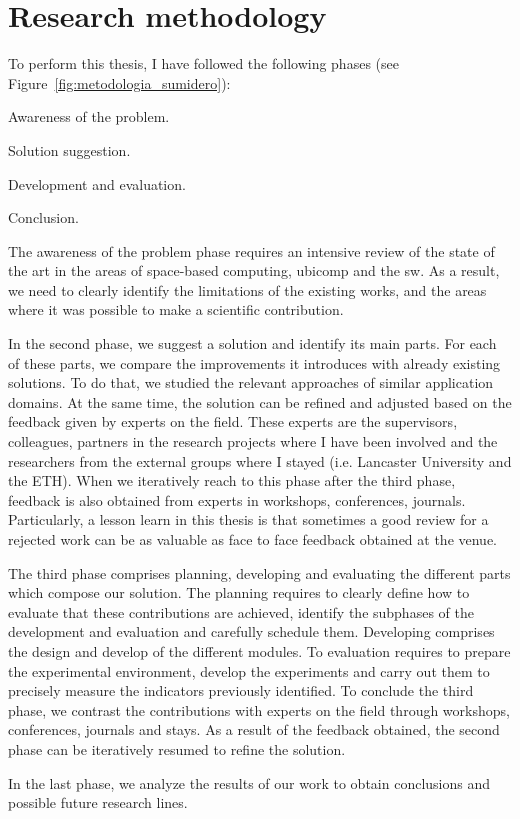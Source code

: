 \section{Research methodology}

To perform this thesis, I have followed the following phases (see Figure~\ref{fig:metodologia_sumidero}):
\begin{enumerate*}[label=\itshape\alph*\upshape)]
  \item Awareness of the problem.
  \item Solution suggestion.
  \item Development and evaluation.
  \item Conclusion.
\end{enumerate*}


The awareness of the problem phase requires an intensive review of the state of the art in the areas of
space-based computing, \acl{ubicomp} and the \acl{sw}.
As a result, we need to clearly identify the limitations of the existing works,
and the areas where it was possible to make a scientific contribution.


In the second phase, we suggest a solution and identify its main parts.
For each of these parts, we compare the improvements it introduces with already existing solutions.
To do that, we studied the relevant approaches of similar application domains.
At the same time, the solution can be refined and adjusted based on the feedback given by experts on the field.
These experts are the supervisors, colleagues, partners in the research projects where I have been involved and the researchers from the external groups where I stayed (i.e. Lancaster University and the ETH).
When we iteratively reach to this phase after the third phase, feedback is also obtained from experts in workshops, conferences, journals.
Particularly, a lesson learn in this thesis is that sometimes a good review for a rejected work can be as valuable as face to face feedback obtained at the venue. %


The third phase comprises planning, developing and evaluating the different parts which compose our solution.
The planning requires to clearly define how to evaluate that these contributions are achieved, identify the subphases of the development and evaluation and carefully schedule them.
Developing comprises the design and develop of the different modules.
To evaluation requires to prepare the experimental environment, develop the experiments and carry out them to precisely measure the indicators previously identified. %
To conclude the third phase, we contrast the contributions with experts on the field through workshops, conferences, journals and stays.
As a result of the feedback obtained, the second phase can be iteratively resumed to refine the solution.


In the last phase, we analyze the results of our work to obtain conclusions and possible future research lines.

